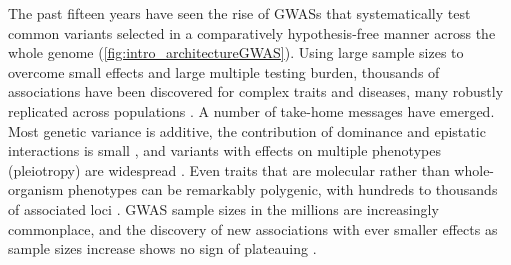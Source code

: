 \begin{outline}
The past fifteen years have seen the rise of \glspl{GWAS} that systematically test common variants selected in a comparatively hypothesis-free manner across the whole genome (\cref{fig:intro_architectureGWAS}).
Using large sample sizes to overcome small effects and large multiple testing burden, thousands of associations have been discovered for complex traits and diseases,
many robustly replicated across populations \autocite{visscher2012FiveYearsGWAS,visscher201710YearsGWAS}.
A number of take-home messages have emerged.
%
Most genetic variance is additive, the contribution of dominance and epistatic interactions is small \autocite{visscher2019Fisher1918Paper}, 
and variants with effects on multiple phenotypes (pleiotropy) are widespread \autocite{visscher2012FiveYearsGWAS}.
Even traits that are molecular rather than whole-organism phenotypes can be remarkably polygenic, with hundreds to thousands of associated loci \autocite{sinnott-armstrong2020GWASThreeMolecular}.
\Gls{GWAS} sample sizes in the millions are increasingly commonplace,
and the discovery of new associations with ever smaller effects as sample sizes increase shows no sign of plateauing \autocite{tam2019BenefitsLimitationsGenomewide,crouch2020PolygenicInheritanceGWAS}.


\end{outline}
